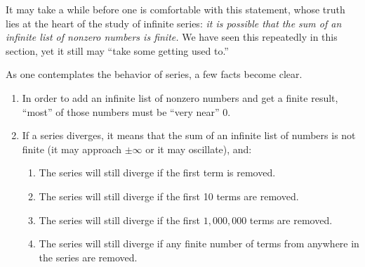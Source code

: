 %

It may take a while before one is comfortable with this statement, whose truth lies at the heart of the study of infinite series: \emph{it is possible that the sum of an infinite list of nonzero numbers is finite.} We have seen this repeatedly in this section, yet it still may ``take some getting used to.''

As one contemplates the behavior of series, a few facts become clear. 
\begin{enumerate}
\item		In order to add an infinite list of nonzero numbers and get a finite result, ``most'' of those numbers must be ``very near'' 0. 
\item		If a series diverges, it means that the sum of an infinite list of numbers is not finite (it may approach $\pm \infty$ or it may oscillate), and:
\begin{enumerate}
	\item	The series will still diverge if the first term is removed.
	\item	The series will still diverge if the first 10 terms are removed.
	\item	The series will still diverge if the first $1{,}000{,}000$ terms are removed.
	\item	The series will still diverge if any finite number of terms from anywhere in the series are removed.
\end{enumerate}
\end{enumerate}

